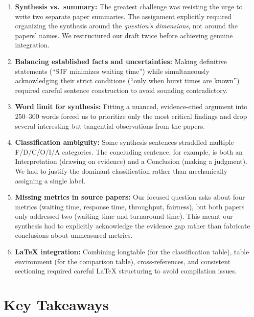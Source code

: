 \documentclass[11pt, a4paper]{article}
\begin{document}
\begin{enumerate}[nosep]
    \item \textbf{Synthesis vs.\ summary:} The greatest challenge was resisting the urge to write two separate paper summaries. The assignment explicitly required organizing the synthesis around the \emph{question's dimensions}, not around the papers' names. We restructured our draft twice before achieving genuine integration.

    \item \textbf{Balancing established facts and uncertainties:} Making definitive statements (``SJF minimizes waiting time'') while simultaneously acknowledging their strict conditions (``only when burst times are known'') required careful sentence construction to avoid sounding contradictory.

    \item \textbf{Word limit for synthesis:} Fitting a nuanced, evidence-cited argument into 250--300 words forced us to prioritize only the most critical findings and drop several interesting but tangential observations from the papers.

    \item \textbf{Classification ambiguity:} Some synthesis sentences straddled multiple F/D/C/O/I/A categories. The concluding sentence, for example, is both an Interpretation (drawing on evidence) and a Conclusion (making a judgment). We had to justify the dominant classification rather than mechanically assigning a single label.

    \item \textbf{Missing metrics in source papers:} Our focused question asks about four metrics (waiting time, response time, throughput, fairness), but both papers only addressed two (waiting time and turnaround time). This meant our synthesis had to explicitly acknowledge the evidence gap rather than fabricate conclusions about unmeasured metrics.

    \item \textbf{LaTeX integration:} Combining longtable (for the classification table), table environment (for the comparison table), cross-references, and consistent sectioning required careful LaTeX structuring to avoid compilation issues.
\end{enumerate}

\section{Key Takeaways}
\end{document}
